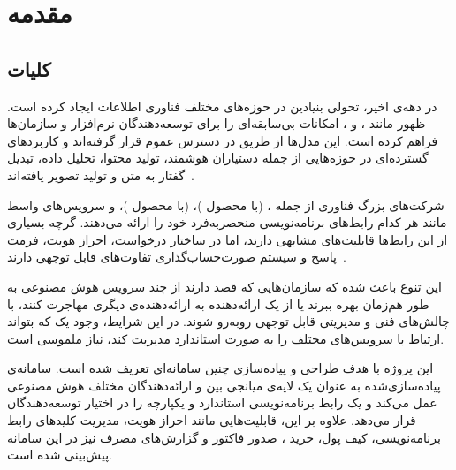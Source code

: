 \chapter{مقدمه}
\label{ch:intro}

\section{کلیات}
\label{sec:intro-overview}

در دهه‌ی اخیر،  تحولی
بنیادین در حوزه‌های مختلف فناوری اطلاعات ایجاد کرده است. ظهور
 مانند
،  و ، امکانات بی‌سابقه‌ای را برای
توسعه‌دهندگان نرم‌افزار و سازمان‌ها فراهم کرده است. این مدل‌ها از طریق
در دسترس عموم قرار گرفته‌اند و کاربردهای گسترده‌ای در حوزه‌هایی از جمله
دستیاران هوشمند، تولید محتوا، تحلیل داده، تبدیل گفتار به متن و تولید تصویر
یافته‌اند~\cite{openai2024}.

شرکت‌های بزرگ فناوری از جمله ،  (با محصول
)،  (با محصول )،  و
سرویس‌های واسط مانند  هر کدام رابط‌های برنامه‌نویسی
منحصربه‌فرد خود را ارائه می‌دهند. گرچه بسیاری از این رابط‌ها قابلیت‌های
مشابهی دارند، اما در ساختار درخواست، احراز هویت، فرمت پاسخ و سیستم
صورت‌حساب‌گذاری تفاوت‌های قابل توجهی دارند~\cite{groq2024, openrouter2024}.

این تنوع باعث شده که سازمان‌هایی که قصد دارند از چند سرویس هوش مصنوعی
به طور هم‌زمان بهره ببرند یا از یک ارائه‌دهنده به ارائه‌دهنده‌ی دیگری مهاجرت
کنند، با چالش‌های فنی و مدیریتی قابل توجهی روبه‌رو شوند. در این شرایط،
وجود یک  که بتواند ارتباط با سرویس‌های مختلف
را به صورت استاندارد مدیریت کند، نیاز ملموسی است.

این پروژه با هدف طراحی و پیاده‌سازی چنین سامانه‌ای تعریف شده است. سامانه‌ی
پیاده‌سازی‌شده به عنوان یک لایه‌ی میانجی بین
 و ارائه‌دهندگان مختلف هوش مصنوعی عمل
می‌کند و یک رابط برنامه‌نویسی استاندارد و یکپارچه را در اختیار
توسعه‌دهندگان قرار می‌دهد. علاوه بر این، قابلیت‌هایی مانند احراز هویت،
مدیریت کلیدهای رابط برنامه‌نویسی، کیف پول، خرید ،
صدور فاکتور و گزارش‌های مصرف نیز در این سامانه پیش‌بینی شده است.

